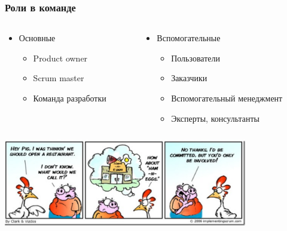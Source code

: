 \documentclass{../../slides-style}
\begin{document}
    \begin{frame}
        \frametitle{Роли в команде}
        \begin{columns}
            \begin{column}{0.5\textwidth}
                \begin{itemize}
                    \item Основные 
                    \begin{itemize}
                        \item Product owner
                        \item Scrum master
                        \item Команда разработки
                    \end{itemize}
                \end{itemize}
            \end{column}
            \begin{column}{0.5\textwidth}
                \begin{itemize}
                    \item Вспомогательные 
                    \begin{itemize}
                        \item Пользователи
                        \item Заказчики
                        \item Вспомогательный менеджмент
                        \item Эксперты, консультанты
                    \end{itemize}
                \end{itemize}
            \end{column}
        \end{columns}
        \begin{center}
            \includegraphics[width=0.8\textwidth]{chickenAndPig.png}
        \end{center}
    \end{frame}
\end{document}
